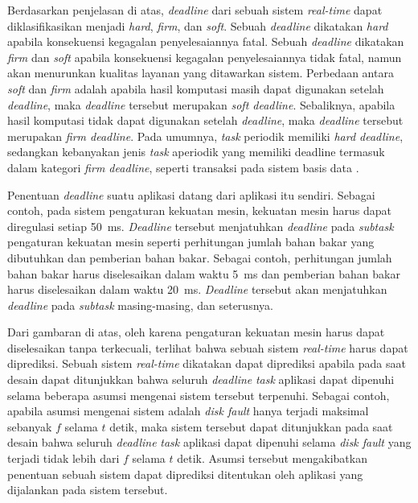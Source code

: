 Berdasarkan penjelasan di atas, \textit{deadline} dari sebuah sistem \textit{real-time} dapat
diklasifikasikan menjadi \textit{hard}, \textit{firm}, dan \textit{soft}.  Sebuah
\textit{deadline} dikatakan \textit{hard} apabila konsekuensi kegagalan penyelesaiannya fatal.
Sebuah \textit{deadline} dikatakan \textit{firm} dan \textit{soft} apabila konsekuensi kegagalan
penyelesaiannya tidak fatal, namun akan menurunkan kualitas layanan yang ditawarkan sistem.
Perbedaan antara \textit{soft} dan \textit{firm} adalah apabila hasil komputasi masih dapat
digunakan setelah \textit{deadline}, maka \textit{deadline} tersebut merupakan \textit{soft
deadline}. Sebaliknya, apabila hasil komputasi tidak dapat digunakan setelah \textit{deadline},
maka \textit{deadline} tersebut merupakan \textit{firm deadline}.  Pada umumnya, \textit{task}
periodik memiliki \textit{hard deadline}, sedangkan kebanyakan jenis \textit{task} aperiodik
yang memiliki deadline termasuk dalam kategori \textit{firm deadline}, seperti transaksi pada
sistem basis data \citep[pp.~203-241]{Haritsa1992}.

Penentuan \textit{deadline} suatu aplikasi datang dari aplikasi itu sendiri.  Sebagai contoh,
pada sistem pengaturan kekuatan mesin, kekuatan mesin harus dapat diregulasi setiap
\SI{50}{\milli\second}.  \textit{Deadline} tersebut menjatuhkan \textit{deadline} pada
\textit{subtask} pengaturan kekuatan mesin seperti perhitungan jumlah bahan bakar yang
dibutuhkan dan pemberian bahan bakar.  Sebagai contoh, perhitungan jumlah bahan bakar harus
diselesaikan dalam waktu \SI{5}{\milli\second} dan pemberian bahan bakar harus diselesaikan
dalam waktu \SI{20}{\milli\second}.  \textit{Deadline} tersebut akan menjatuhkan
\textit{deadline} pada \textit{subtask} masing-masing, dan seterusnya.

Dari gambaran di atas, oleh karena pengaturan kekuatan mesin harus dapat diselesaikan tanpa
terkecuali, terlihat bahwa sebuah sistem \textit{real-time} harus dapat diprediksi.  Sebuah
sistem \textit{real-time} dikatakan dapat diprediksi apabila pada saat desain dapat ditunjukkan
bahwa seluruh \textit{deadline} \textit{task} aplikasi dapat dipenuhi selama beberapa asumsi
mengenai sistem tersebut terpenuhi.  Sebagai contoh, apabila asumsi mengenai sistem adalah
\textit{disk fault} hanya terjadi maksimal sebanyak $f$ selama $t$ detik, maka sistem tersebut
dapat  ditunjukkan pada saat desain bahwa seluruh \textit{deadline} \textit{task} aplikasi dapat
dipenuhi selama \textit{disk fault} yang terjadi tidak lebih dari $f$ selama $t$ detik.  Asumsi
tersebut mengakibatkan penentuan sebuah sistem dapat diprediksi ditentukan oleh aplikasi yang
dijalankan pada sistem tersebut.


